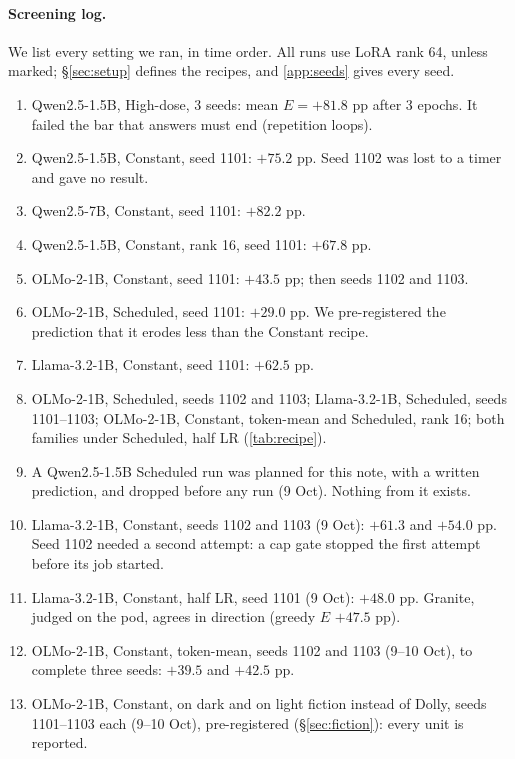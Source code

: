 \documentclass{article}
\begin{document}
\paragraph{Screening log.} We list every setting we ran, in time order. All
runs use LoRA rank 64, unless marked; \S\ref{sec:setup} defines the recipes,
and \cref{app:seeds} gives every seed.
\begin{enumerate}
  \item Qwen2.5-1.5B, High-dose, 3 seeds: mean $E = +81.8$ pp after 3 epochs.
        It failed the bar that answers must end (repetition loops).
  \item Qwen2.5-1.5B, Constant, seed 1101: $+75.2$ pp. Seed 1102 was lost to a
        timer and gave no result.
  \item Qwen2.5-7B, Constant, seed 1101: $+82.2$ pp.
  \item Qwen2.5-1.5B, Constant, rank 16, seed 1101: $+67.8$ pp.
  \item OLMo-2-1B, Constant, seed 1101: $+43.5$ pp; then seeds 1102 and 1103.
  \item OLMo-2-1B, Scheduled, seed 1101: $+29.0$ pp. We pre-registered the
        prediction that it erodes less than the Constant recipe.
  \item Llama-3.2-1B, Constant, seed 1101: $+62.5$ pp.
  \item OLMo-2-1B, Scheduled, seeds 1102 and 1103; Llama-3.2-1B, Scheduled,
        seeds 1101--1103; OLMo-2-1B, Constant, token-mean and Scheduled, rank
        16; both families under Scheduled, half LR (\cref{tab:recipe}).
  \item A Qwen2.5-1.5B Scheduled run was planned for this note, with a written
        prediction, and dropped before any run (9 Oct). Nothing from it exists.
  \item Llama-3.2-1B, Constant, seeds 1102 and 1103 (9 Oct): $+61.3$ and
        $+54.0$ pp. Seed 1102 needed a second attempt: a cap gate stopped the
        first attempt before its job started.
  \item Llama-3.2-1B, Constant, half LR, seed 1101 (9 Oct): $+48.0$ pp. Granite,
        judged on the pod, agrees in direction (greedy $E$ $+47.5$ pp).
  \item OLMo-2-1B, Constant, token-mean, seeds 1102 and 1103 (9--10 Oct), to
        complete three seeds: $+39.5$ and $+42.5$ pp.
  \item OLMo-2-1B, Constant, on dark and on light fiction instead of Dolly,
        seeds 1101--1103 each (9--10 Oct), pre-registered
        (\S\ref{sec:fiction}): every unit is reported.

\end{enumerate}
\end{document}
